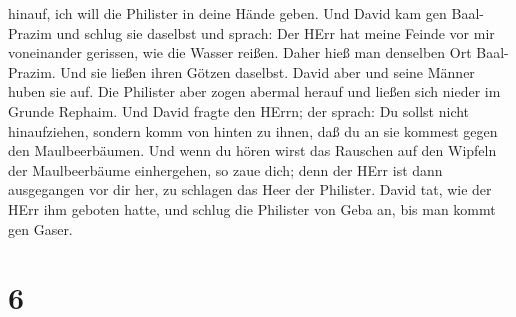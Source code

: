hinauf, ich will die Philister in deine Hände geben.  Und
David kam gen Baal-Prazim und schlug sie daselbst und sprach: Der HErr
hat meine Feinde vor mir voneinander gerissen, wie die Wasser reißen.
Daher hieß man denselben Ort Baal-Prazim.  Und sie ließen
ihren Götzen daselbst. David aber und seine Männer huben sie auf.
 Die Philister aber zogen abermal herauf und ließen sich
nieder im Grunde Rephaim.  Und David fragte den HErrn; der
sprach: Du sollst nicht hinaufziehen, sondern komm von hinten zu ihnen,
daß du an sie kommest gegen den Maulbeerbäumen.  Und wenn
du hören wirst das Rauschen auf den Wipfeln der Maulbeerbäume
einhergehen, so zaue dich; denn der HErr ist dann ausgegangen vor dir
her, zu schlagen das Heer der Philister.  David tat, wie
der HErr ihm geboten hatte, und schlug die Philister von Geba an, bis
man kommt gen Gaser.

\hypertarget{section-5}{%
\section{6}\label{section-5}}

